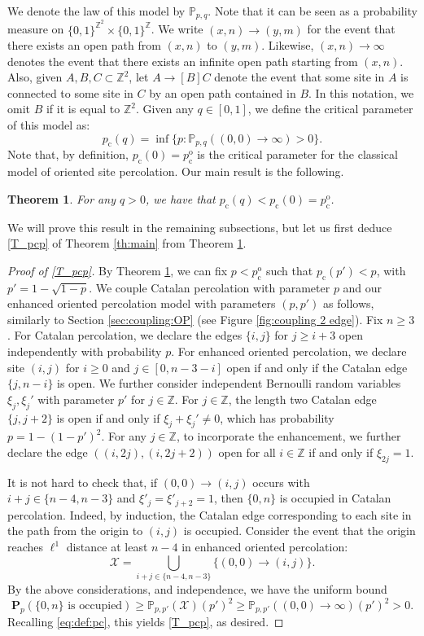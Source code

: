 \documentclass[pdflatex,sn-mathphys-num]{sn-jnl}%
\newcommand{\cX}{\ensuremath{\mathcal X}}
\newcommand{\bbP}{{\ensuremath{\mathbb P}} }
\newcommand{\bbZ}{{\ensuremath{\mathbb Z}} }
\newcommand{\bfP}{\mathbf{P}}
\newcommand{\1}{{\ensuremath{\mathbf{1}}} }
\newcommand{\pc}{\ensuremath{p_{\mathrm{c}} }}
\newcommand{\pco}{\ensuremath{p_{\mathrm{c}}^{\mathrm{o}} }}
\theoremstyle{thmstyleone}%
\newtheorem{theorem}{Theorem}%
\theoremstyle{thmstyletwo}%
\theoremstyle{thmstylethree}%
\begin{document}
We denote the law of this model by $\mathbb P_{p,q}$. Note that it can be seen as a probability measure on $\{0,1\}^{\mathbb Z^{2}}\times \{0,1\}^{\mathbb Z}$. 
We write $(x,n)\rightarrow (y,m)$ for the event that there exists an open path from $(x,n)$ to $(y,m)$. Likewise, $(x,n)\rightarrow \infty$ denotes the event that there exists an infinite open path starting from $(x,n)$. Also, given $A,B,C\subset \mathbb Z^{2}$, let 
$A\to[B]C$ denote the event that some site in $A$ is connected to some site in $C$ by an open path contained in $B$. {In this notation, we omit $B$ if it is equal to $\bbZ^2$.} Given any $q\in [0,1]$, we define the critical parameter of this model as:
$$\pc(q) = \inf\big\{ p : \mathbb P_{p,q}((0,0)\rightarrow \infty)>0\big\}.$$
Note that, by definition, $\pc(0) = \pco$ is the  critical parameter for the classical model of oriented site percolation. Our main result is the following. 
\begin{theorem} \label{theo:pq}
For any $q>0$, we have that 
$\pc(q) < \pc(0)=\pco$.
\end{theorem}
We will prove this result in the remaining subsections{, but let us first deduce \eqref{T_pcp} of Theorem \ref{th:main} from Theorem \ref{theo:pq}.}



\begin{proof}[Proof of \eqref{T_pcp}]
{By Theorem \ref{theo:pq}, we can fix $p<\pco$ such that $\pc(p')<p$, with $p'=1-\sqrt{1-p}$. We couple Catalan percolation with parameter $p$ and our enhanced oriented percolation model with parameters $(p,p')$ as follows, similarly to Section \ref{sec:coupling:OP} (see Figure \ref{fig:coupling 2 edge}). Fix $n\ge 3$. For Catalan percolation, we declare the edges $\{i,j\}$ for $j\ge i+3$ open independently with probability $p$. For enhanced oriented percolation, we declare site $(i,j)$ for $i\ge 0$ and $j\in[0,n-3-i]$ open if and only if the Catalan edge $\{j,n-i\}$ is open. We further consider independent Bernoulli random variables $\xi_j,\xi_j'$ with parameter $p'$ for $j\in\bbZ$. For $j\in\bbZ$, the length two Catalan edge $\{j,j+2\}$ is open if and only if $\xi_j+\xi_j'\neq 0$, which has probability $p=1-(1-p')^2$. For any $j\in\bbZ$, 
to incorporate the enhancement, 
we further declare the edge $((i,2j),(i,2j+2))$ open for all $i\in\bbZ$ if and only if $\xi_{2j}=1$.

It is not hard to check that, if $(0,0)\to(i,j)$ occurs with $i+j\in\{n-4,n-3\}$ and $\xi'_{j}=\xi'_{j+2}=1$, then $\{0,n\}$ is occupied in Catalan percolation.  Indeed, by induction, the Catalan edge corresponding to each site in the path from the origin to $(i,j)$ is occupied. Consider the event that the origin reaches $\ell^1$ distance at least $n-4$ in enhanced oriented percolation:
\[\cX=\bigcup_{i+j\in\{n-4,n-3\}}\{(0,0)\to (i,j)\}.\]
By the above considerations, and independence, we have the uniform bound
\[\bfP_p(\{0,n\}\text{ is occupied})\ge \bbP_{p,p'}(\cX)(p')^2\ge \bbP_{p,p'}((0,0)\to\infty)(p')^2>0.\]
Recalling \eqref{eq:def:pc}, this yields \eqref{T_pcp}, as desired.}
\end{proof}
\end{document}

